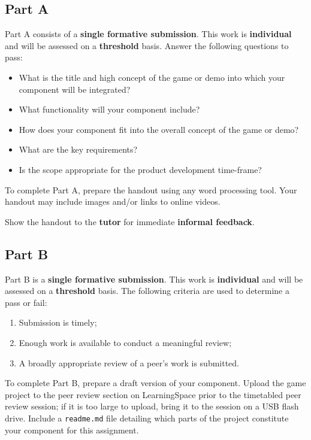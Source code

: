 \subsection*{Part A}

Part A consists of a \textbf{single formative submission}. This work is \textbf{individual} and will be assessed on a \textbf{threshold} basis. Answer the following questions to pass:

\begin{itemize}
	\item What is the title and high concept of the game or demo into which your component will be integrated?
	\item What functionality will your component include?
	\item How does your component fit into the overall concept of the game or demo?
	\item What are the key requirements?
	\item Is the scope appropriate for the product development time-frame?
\end{itemize}

To complete Part A, prepare the handout using any word processing tool.
Your handout may include images and/or links to online videos.

Show the handout to the \textbf{tutor} for immediate \textbf{informal feedback}.

\subsection*{Part B}

Part B is a \textbf{single formative submission}. This work is \textbf{individual} and will be assessed on a \textbf{threshold} basis. The following criteria are used to determine a pass or fail:

\begin{enumerate}[label=(\alph*)]
	\item Submission is timely;
	\item Enough work is available to conduct a meaningful review;
	\item A broadly appropriate review of a peer's work is submitted.
\end{enumerate}

To complete Part B, prepare a draft version of your component.
Upload the game project to the peer review section on LearningSpace prior to the timetabled peer review session;
if it is too large to upload, bring it to the session on a USB flash drive.
Include a \texttt{readme.md} file detailing which parts of the project constitute your component for this assignment.

